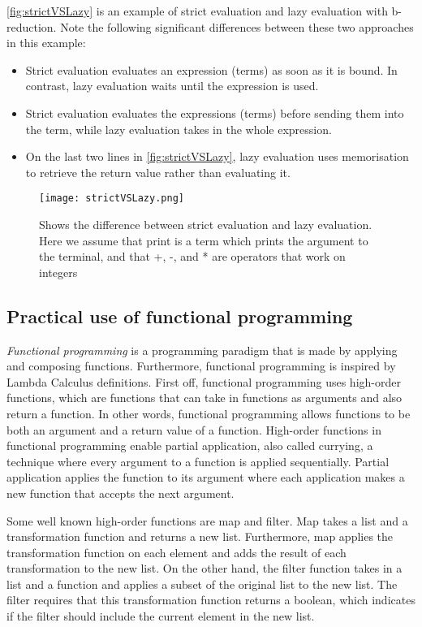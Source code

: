 \para
\autoref{fig:strictVSLazy} is an example of strict evaluation and lazy evaluation with b-reduction. Note the following significant differences between these two approaches in this example:

\begin{itemize}
    \item Strict evaluation evaluates an expression (terms) as soon as it is bound. In contrast, lazy evaluation waits until the expression is used.
    \item Strict evaluation evaluates the expressions (terms) before sending them into the term, while lazy evaluation takes in the whole expression.
    \item On the last two lines in \autoref{fig:strictVSLazy}, lazy evaluation uses memorisation to retrieve the return value rather than evaluating it.
\end{itemize}


\begin{figure}
    \centering
    \texttt{[image: strictVSLazy.png]}
    \caption{Shows the difference between strict evaluation and lazy evaluation. Here we assume that print is a term which prints the argument to the terminal, and that +, -, and * are operators that work on integers}
    \label{fig:strictVSLazy}
\end{figure}

\subsection{Practical use of functional programming}
\emph{Functional programming} is a programming paradigm that is made by applying and composing functions. Furthermore, functional programming is inspired by Lambda Calculus definitions. First off, functional programming uses high-order functions, which are functions that can take in functions as arguments and also return a function. In other words, functional programming allows functions to be both an argument and a return value of a function. High-order functions in functional programming enable partial application, also called currying, a technique where every argument to a function is applied sequentially. Partial application applies the function to its argument where each application makes a new function that accepts the next argument.

\para
Some well known high-order functions are map and filter. Map takes a list and a transformation function and returns a new list. Furthermore, map applies the transformation function on each element and adds the result of each transformation to the new list. On the other hand, the filter function takes in a list and a function and applies a subset of the original list to the new list. The filter requires that this transformation function returns a boolean, which indicates if the filter should include the current element in the new list.

